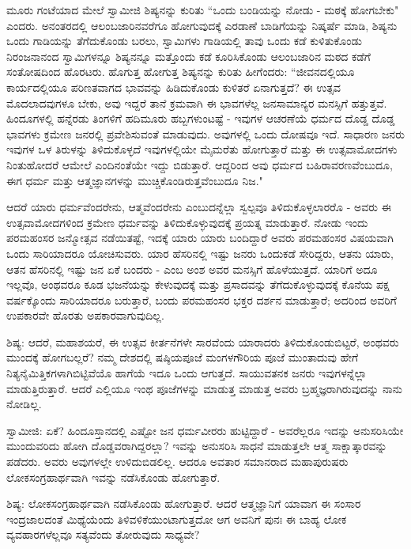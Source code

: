 ಮೂರು ಗಂಟೆಯಾದ ಮೇಲೆ ಸ್ವಾಮೀಜಿ ಶಿಷ್ಯನನ್ನು ಕುರಿತು “ಒಂದು ಬಂಡಿಯನ್ನು ನೋಡು - ಮಠಕ್ಕೆ ಹೋಗಬೇಕು" ಎಂದರು. ಅನಂತರದಲ್ಲಿ ಆಲಂಬಜಾರಿನವರೆಗೂ ಹೋಗುವುದಕ್ಕೆ ಎರಡಾಣೆ ಬಾಡಿಗೆಯನ್ನು ನಿಷ್ಕರ್ಷೆ ಮಾಡಿ, ಶಿಷ್ಯನು ಒಂದು ಗಾಡಿಯನ್ನು ತೆಗೆದುಕೊಂಡು ಬರಲು, ಸ್ವಾಮಿಗಳು ಗಾಡಿಯಲ್ಲಿ ತಾವು ಒಂದು ಕಡೆ ಕುಳಿತುಕೊಂಡು ನಿರಂಜನಾನಂದ ಸ್ವಾಮಿಗಳನ್ನೂ ಶಿಷ್ಯನನ್ನೂ ಮತ್ತೊಂದು ಕಡೆ ಕೂರಿಸಿಕೊಂಡು ಆಲಂಬಜಾರಿನ ಮಠದ ಕಡೆಗೆ ಸಂತೋಷದಿಂದ ಹೊರಟರು. ಹೊಗುತ್ತ ಹೋಗುತ್ತ ಶಿಷ್ಯನನ್ನು ಕುರಿತು ಹೀಗೆಂದರು: “ಜೀವನದಲ್ಲಿಯೂ ಕಾರ್ಯದಲ್ಲಿಯೂ ಪರಿಣತವಾಗದ ಭಾವವನ್ನು ಹಿಡಿದುಕೊಂಡು ಕುಳಿತರೆ ಏನಾಗುತ್ತದೆ? ಈ ಉತ್ಸವ ಮೊದಲಾದವುಗಳೂ ಬೇಕು, ಅವು ಇದ್ದರೆ ತಾನೆ ಕ್ರಮವಾಗಿ ಈ ಭಾವಗಳೆಲ್ಲ ಜನಸಾಮಾನ್ಯರ ಮನಸ್ಸಿಗೆ ಹತ್ತುತ್ತವೆ. ಹಿಂದೂಗಳಲ್ಲಿ ಹನ್ನೆರಡು ತಿಂಗಳಿಗೆ ಹದಿಮೂರು ಹಬ್ಬಗಳುಂಟಷ್ಟೆ - ಇವುಗಳ ಆಚರಣೆಯೆ ಧರ್ಮದ ದೊಡ್ಡ ದೊಡ್ಡ ಭಾವಗಳು ಕ್ರಮೇಣ ಜನರಲ್ಲಿ ಪ್ರವೇಶಿಸುವಂತೆ ಮಾಡುವುದು. ಅವುಗಳಲ್ಲಿ ಒಂದು ದೋಷವೂ ಇದೆ. ಸಾಧಾರಣ ಜನರು ಇವುಗಳ ಒಳ ತಿರುಳನ್ನು ತಿಳಿದುಕೊಳ್ಳದೆ ಇವುಗಳಲ್ಲಿಯೇ ಮೈಮರೆತು ಹೋಗುತ್ತಾರೆ ಮತ್ತು ಈ ಉತ್ಸವಾಮೋದಗಳು ನಿಂತುಹೋದರೆ ಆಮೇಲೆ ಎಂದಿನಂತೆಯೇ ಇದ್ದು ಬಿಡುತ್ತಾರೆ. ಆದ್ದರಿಂದ ಅವು ಧರ್ಮದ ಬಹಿರಾವರಣವೆಂಬುದೂ, ಈಗ ಧರ್ಮ ಮತ್ತು ಆತ್ಮಜ್ಞಾನಗಳನ್ನು ಮುಚ್ಚಿಕೊಂಡಿರುತ್ತವೆಂಬುದೂ ನಿಜ."

ಆದರೆ ಯಾರು ಧರ್ಮವೆಂದರೇನು, ಆತ್ಮವೆಂದರೇನು ಎಂಬುದನ್ನೆಲ್ಲಾ ಸ್ವಲ್ಪವೂ ತಿಳಿದುಕೊಳ್ಳಲಾರರೊ - ಅವರು ಈ ಉತ್ಸವಾಮೋದಗಳಿಂದ ಕ್ರಮೇಣ ಧರ್ಮವನ್ನು ತಿಳಿದುಕೊಳ್ಳುವುದಕ್ಕೆ ಪ್ರಯತ್ನ ಮಾಡುತ್ತಾರೆ. ನೋಡು ಇಂದು ಪರಮಹಂಸರ ಜನ್ಮೋತ್ಸವ ನಡೆಯಿತಷ್ಟೆ, ಇದಕ್ಕೆ ಯಾರು ಯಾರು ಬಂದಿದ್ದಾರೆ ಅವರು ಪರಮಹಂಸರ ವಿಷಯವಾಗಿ ಒಂದು ಸಾರಿಯಾದರೂ ಯೋಚಿಸುವರು. ಯಾರ ಹೆಸರಿನಲ್ಲಿ ಇಷ್ಟು ಜನರು ಒಂದುಕಡೆ ಸೇರಿದ್ದರು, ಆತನು ಯಾರು, ಆತನ ಹೆಸರಿನಲ್ಲಿ ಇಷ್ಟು ಜನ ಏಕೆ ಬಂದರು - ಎಂಬ ಅಂಶ ಅವರ ಮನಸ್ಸಿಗೆ ಹೊಳೆಯುತ್ತದೆ. ಯಾರಿಗೆ ಅದೂ ಇಲ್ಲವೊ, ಅಂಥವರೂ ಕೂಡ ಭಜನೆಯನ್ನು ಕೇಳುವುದಕ್ಕೆ ಮತ್ತು ಪ್ರಸಾದವನ್ನು ತೆಗೆದುಕೊಳ್ಳುವುದಕ್ಕೆ ಕೊನೆಯ ಪಕ್ಷ ವರ್ಷಕ್ಕೊಂದು ಸಾರಿಯಾದರೂ ಬರುತ್ತಾರೆ, ಬಂದು ಪರಮಹಂಸರ ಭಕ್ತರ ದರ್ಶನ ಮಾಡುತ್ತಾರೆ; ಅದರಿಂದ ಅವರಿಗೆ ಉಪಕಾರವೇ ಹೊರತು ಅಪಕಾರವಾಗುವುದಿಲ್ಲ.

ಶಿಷ್ಯ: ಆದರೆ, ಮಹಾಶಯರೆ, ಈ ಉತ್ಸವ ಕೀರ್ತನೆಗಳೇ ಸಾರವೆಂದು ಯಾರಾದರು ತಿಳಿದುಕೊಂಡುಬಿಟ್ಟರೆ, ಅಂಥವರು ಮುಂದಕ್ಕೆ ಹೋಗಬಲ್ಲರೆ? ನಮ್ಮ ದೇಶದಲ್ಲಿ ಷಷ್ಠಿಯಪೂಜೆ ಮಂಗಳಗೌರಿಯ ಪೂಜೆ ಮುಂತಾದುವು ಹೇಗೆ ನಿತ್ಯನೈಮಿತ್ತಿಕಗಳಾಗಿಬಿಟ್ಟಿವೆಯೊ ಹಾಗೆಯೆ ಇದೂ ಒಂದು ಆಗುತ್ತದೆ. ಸಾಯುವತನಕ ಜನರು ಇವುಗಳನ್ನೆಲ್ಲಾ ಮಾಡುತ್ತಿರುತ್ತಾರೆ. ಆದರೆ ಎಲ್ಲಿಯೂ ಇಂಥ ಪೂಜೆಗಳನ್ನು ಮಾಡುತ್ತ ಮಾಡುತ್ತ ಅವರು ಬ್ರಹ್ಮಜ್ಞರಾಗಿರುವುದನ್ನು ನಾನು ನೋಡಿಲ್ಲ.

ಸ್ವಾಮೀಜಿ: ಏಕೆ? ಹಿಂದೂಸ್ತಾನದಲ್ಲಿ ಎಷ್ಟೋ ಜನ ಧರ್ಮವೀರರು ಹುಟ್ಟಿದ್ದಾರೆ - ಅವರೆಲ್ಲರೂ ಇದನ್ನು ಅನುಸರಿಸಿಯೇ ಮುಂದುವರಿದು ಹೋಗಿ ದೊಡ್ಡವರಾಗಿದ್ದರಲ್ಲಾ? ಇವನ್ನು ಅನುಸರಿಸಿ ಸಾಧನೆ ಮಾಡುತ್ತಲೇ ಆತ್ಮ ಸಾಕ್ಷಾತ್ಕಾರವನ್ನು ಪಡೆದರು. ಅವರು ಅವುಗಳಲ್ಲೇ ಉಳಿದುಬಿಡಲಿಲ್ಲ. ಆದರೂ ಅವತಾರ ಸಮಾನರಾದ ಮಹಾಪುರುಷರು ಲೋಕಸಂಗ್ರಹಾರ್ಥವಾಗಿ ಇವನ್ನು ನಡೆಸಿಕೊಂಡು ಹೋಗುತ್ತಾರೆ.

ಶಿಷ್ಯ: ಲೋಕಸಂಗ್ರಹಾರ್ಥವಾಗಿ ನಡೆಸಿಕೊಂಡು ಹೋಗುತ್ತಾರೆ. ಆದರೆ ಆತ್ಮಜ್ಞಾನಿಗೆ ಯಾವಾಗ ಈ ಸಂಸಾರ ಇಂದ್ರಜಾಲದಂತೆ ಮಿಥ್ಯೆಯೆಂದು ತಿಳಿವಳಿಕೆಯುಂಟಾಗುತ್ತದೋ ಆಗ ಅವನಿಗೆ ಪುನಃ ಈ ಬಾಹ್ಯ ಲೋಕ ವ್ಯವಹಾರಗಳೆಲ್ಲವೂ ಸತ್ಯವೆಂದು ತೋರುವುದು ಸಾಧ್ಯವೇ?

